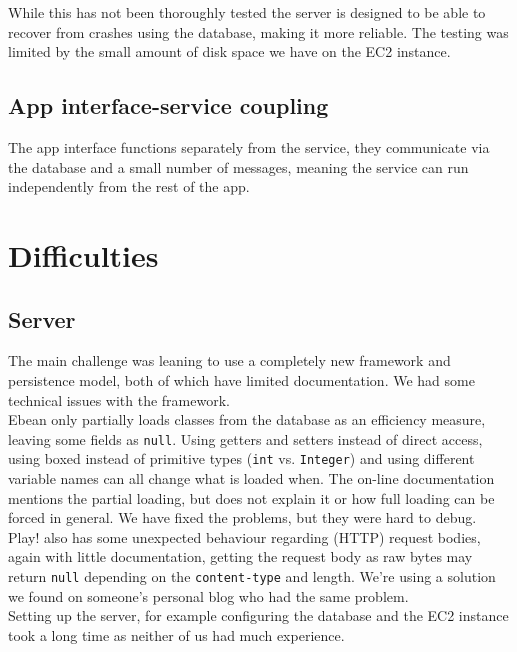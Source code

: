 \documentclass[a4paper,10pt]{article}
\begin{document}
While this has not been thoroughly tested the server is designed to be able to recover from crashes using the database,
making it more reliable.
The testing was limited by the small amount of disk space we have on the EC2 instance.

\subsection{App interface-service coupling}

The app interface functions separately from the service, they communicate via the database and a small number of
messages, meaning the service can run independently from the rest of the app.

\section{Difficulties}

\subsection{Server}

The main challenge was leaning to use a completely new framework and persistence model, both of which have limited documentation.
We had some technical issues with the framework.\\

Ebean only partially loads classes from the database as an efficiency measure, leaving some fields as \texttt{null}.
Using getters and setters instead of direct access, using boxed instead of primitive types (\texttt{int} vs. \texttt{Integer}) and using different variable names
can all change what is loaded when. The on-line documentation mentions the partial loading, but does not explain it or how full loading can be forced in general.
We have fixed the problems, but they were hard to debug.\\

Play! also has some unexpected behaviour regarding (HTTP) request bodies, again with little documentation, getting the
request body as raw bytes may return \texttt{null} depending on the \texttt{content-type} and length.
We're using a solution we found on someone's personal blog who had the same problem.\\

Setting up the server, for example configuring the database and the EC2 instance took a long time
as neither of us had much experience.
\end{document}
